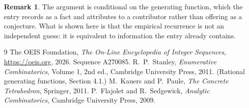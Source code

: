 \documentclass[11pt,a4paper]{article}
\theoremstyle{plain}
\theoremstyle{definition}
\newtheorem{remark}[theorem]{Remark}
\begin{document}
\begin{remark}
The argument is conditional on the generating function, which the entry records as a fact and
attributes to a contributor rather than offering as a conjecture. What is shown here is that
the empirical recurrence is not an independent guess: it is equivalent to information the
entry already contains.
\end{remark}

\begin{thebibliography}{9}
 The OEIS Foundation, \emph{The On-Line Encyclopedia of Integer
Sequences}, \url{https://oeis.org}, 2026. Sequence A270085.
 R.~P.~Stanley, \emph{Enumerative Combinatorics}, Volume 1, 2nd ed.,
Cambridge University Press, 2011. (Rational generating functions, Section 4.1.)
 M.~Kauers and P.~Paule, \emph{The Concrete Tetrahedron}, Springer, 2011.
 P.~Flajolet and R.~Sedgewick, \emph{Analytic Combinatorics}, Cambridge
University Press, 2009.
\end{thebibliography}
\end{document}
